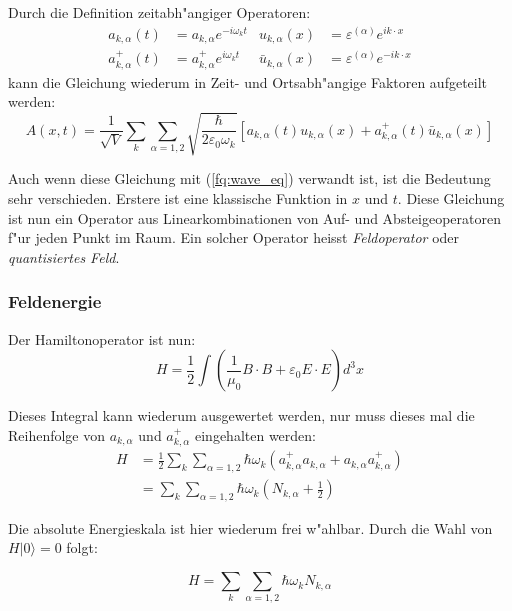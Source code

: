 Durch die Definition zeitabh"angiger Operatoren:
\begin{align*}
a_{k,\alpha}(t) &= a_{k,\alpha} e^{-i \omega_k t} &
u_{k,\alpha}(x) &= \varepsilon^{(\alpha)} e^{ik \cdot x} \\
a^+_{k,\alpha}(t) &= a^+_{k,\alpha} e^{i \omega_k t} &
\bar{u}_{k,\alpha}(x) &= \varepsilon^{(\alpha)} e^{-ik \cdot x}
\end{align*}
kann die Gleichung wiederum in Zeit- und Ortsabh"angige Faktoren aufgeteilt werden:
\begin{equation*}
A(x,t) = \frac{1}{\sqrt{V}} \sum_k \sum_{\alpha=1,2} \sqrt{\frac{\hbar}{2 \varepsilon_0 \omega_k}}\left[a_{k,\alpha}(t) u_{k,\alpha}(x) + a^+_{k,\alpha}(t) \bar{u}_{k,\alpha}(x) \right]
\end{equation*}

Auch wenn diese Gleichung mit (\ref{fq:wave_eq}) verwandt ist, ist die Bedeutung sehr verschieden. Erstere ist eine klassische Funktion in $x$ und $t$. Diese Gleichung ist nun ein Operator aus Linearkombinationen von Auf- und Absteigeoperatoren f"ur jeden Punkt im Raum. Ein solcher Operator heisst {\em Feldoperator} oder {\em quantisiertes Feld}.

\subsubsection{Feldenergie}
Der Hamiltonoperator ist nun:
\begin{equation*}
H = \frac{1}{2} \int \left(\frac{1}{\mu_0} B \cdot B + \varepsilon_0 E \cdot E \right) d^3 x
\end{equation*}

Dieses Integral kann wiederum ausgewertet werden, nur muss dieses mal die Reihenfolge von $a_{k,\alpha}$ und $a^+_{k,\alpha}$ eingehalten werden:
\begin{equation*}
\begin{split}
H &= \frac{1}{2} \sum_k \sum_{\alpha=1,2} \hbar \omega_k \left(a^+_{k,\alpha} a_{k,\alpha} + a_{k,\alpha} a^+_{k,\alpha}\right) \\
&= \sum_k \sum_{\alpha=1,2} \hbar \omega_k \left(N_{k,\alpha} + \frac{1}{2} \right)
\end{split}
\end{equation*}

Die absolute Energieskala ist hier wiederum frei w"ahlbar. Durch die Wahl von $H|0\rangle = 0$ folgt:

\begin{equation*}
H = \sum_k \sum_{\alpha=1,2} \hbar \omega_k N_{k,\alpha}
\end{equation*}

